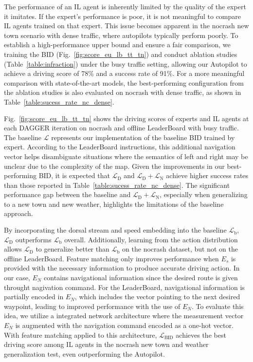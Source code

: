 \hspace{1pc}The performance of an IL agent is inherently limited by the quality of the expert it imitates. 
If the expert's performance is poor, it is not meaningful to compare IL agents trained on that expert. 
This issue becomes apparent in the nocrash new town scenario with dense traffic, where autopilots typically perform poorly. 
To establish a high-performance upper bound and ensure a fair comparison, we training the BID (Fig.~\ref{fig:score_eu_lb_tt_tn}) and conduct ablation studies (Table~\ref{table:infraction}) under the busy traffic setting, allowing our Autopilot to achieve a driving score of 78\% and a success rate of 91\%. 
For a more meaningful comparison with state-of-the-art models, the best-performing configuration from the ablation studies is also evaluated on nocrash with dense traffic, as shown in Table~\ref{table:sucess_rate_nc_dense}.


Fig.~\ref{fig:score_eu_lb_tt_tn} shows the driving scores of experts and IL agents at each DAGGER iteration on nocrash and offline LeaderBoard with busy traffic.
The baseline $\mathcal{L}$ represents our implementation of the baseline BID trained by expert. 
According to the LeaderBoard instructions, this additional navigation vector helps disambiguate situations where the semantics of left and right may be unclear due to the complexity of the map.
Given the improvements in our best-performing BID, it is expected that $\mathcal{L}_\text{D}$ and $\mathcal{L}_\text{D} + \mathcal{L}_\text{N}$ achieve higher success rates than those reported in Table~\ref{table:sucess_rate_nc_dense}.
The significant performance gap between the baseline and $\mathcal{L}_\text{D} + \mathcal{L}_\text{N}$, especially when generalizing to a new town and new weather, highlights the limitations of the baseline approach.


By incorporating the dorsal stream and speed embedding into the baseline $\mathcal{L}_\text{b}$, $\mathcal{L}_\text{D}$ outperforms $\mathcal{L}_\text{b}$ overall.
Additionally, learning from the action distribution allows $\mathcal{L}_\text{D}$ to generalize better than $\mathcal{L}_\text{b}$ on the nocrash dataset, but not on the offline LeaderBoard.
Feature matching only improves performance when $E_s$ is provided with the necessary information to produce accurate driving action.
In our case, $E_N$ contains navigational information since the desired route is given throught nagivation command.
For the LeaderBoard, navigational information is partially encoded in $E_N$, which includes the vector pointing to the next desired waypoint, leading to improved performance with the use of $E_N$.
To evaluate this idea, we utilize a integrated network architecture where the measurement vector $E_N$ is augmented with the navigation command encoded as a one-hot vector.
With feature matching applied to this architecture, $\mathcal{L}_\text{BID}$ achieves the best driving score among IL agents in the nocrash new town and weather generalization test, even outperforming the Autopilot.



